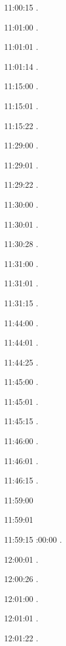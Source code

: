 11:00:15 .

11:01:00 . 

11:01:01 . 

11:01:14 . 

11:15:00 . 

11:15:01 . 

11:15:22 . 

11:29:00 . 

11:29:01 . 

11:29:22 . 

11:30:00 .

11:30:01 .

11:30:28 .

11:31:00 .

11:31:01 .

11:31:15 .

11:44:00 .

11:44:01 .

11:44:25 .

11:45:00 .

11:45:01 .

11:45:15 .

11:46:00 .

11:46:01 .

11:46:15 .

11:59:00 

11:59:01 

11:59:15 
:00:00 .

12:00:01 .

12:00:26 .

12:01:00 . 

12:01:01 . 

12:01:22 . 

